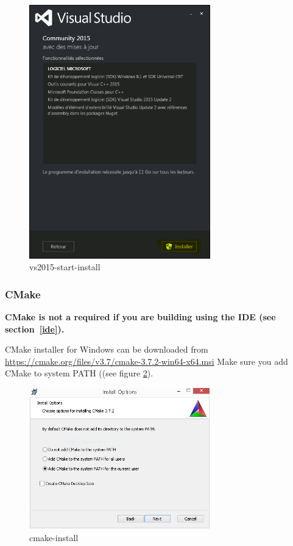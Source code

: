 \documentclass[10pt,a4paper]{article}
\begin{document}
\begin{figure}[!htbp]
  \center
  \includegraphics[width=0.7\textwidth]{Art/vs2015-start-install.png}
  \caption[]{vs2015-start-install}
  \label{fig:vs2015-start-install}
\end{figure}

\subsubsection{CMake}

\textbf{CMake is not a required if you are building using the IDE (see section~\ref{ide}).}

CMake installer for Windows can be downloaded from \url{https://cmake.org/files/v3.7/cmake-3.7.2-win64-x64.msi}
\newline
Make sure you add CMake to system PATH ((see figure \ref{fig:cmake-install}).

\begin{figure}[!htbp]
  \center
  \includegraphics[width=0.7\textwidth]{Art/cmake-install.png}
  \caption[]{cmake-install}
  \label{fig:cmake-install}
\end{figure}
\end{document}
